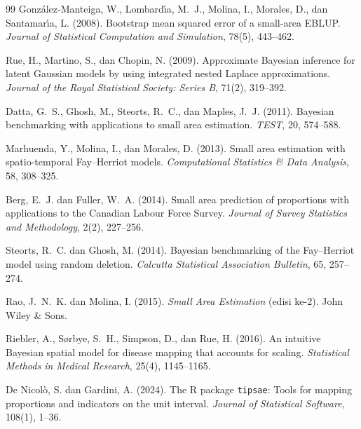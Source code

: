 \documentclass[11pt,a4paper]{article}
\theoremstyle{definition}
\begin{document}
\begin{thebibliography}{99}
Gonz\'alez-Manteiga, W., Lombard{\'\i}a, M.~J., Molina, I., Morales, D., dan
Santamar{\'\i}a, L. (2008).
Bootstrap mean squared error of a small-area EBLUP.
\emph{Journal of Statistical Computation and Simulation}, 78(5), 443--462.

Rue, H., Martino, S., dan Chopin, N. (2009).
Approximate Bayesian inference for latent Gaussian models by using integrated
nested Laplace approximations.
\emph{Journal of the Royal Statistical Society: Series B}, 71(2), 319--392.

Datta, G.~S., Ghosh, M., Steorts, R.~C., dan Maples, J.~J. (2011).
Bayesian benchmarking with applications to small area estimation.
\emph{TEST}, 20, 574--588.

Marhuenda, Y., Molina, I., dan Morales, D. (2013).
Small area estimation with spatio-temporal Fay--Herriot models.
\emph{Computational Statistics \& Data Analysis}, 58, 308--325.

Berg, E.~J. dan Fuller, W.~A. (2014).
Small area prediction of proportions with applications to the Canadian Labour
Force Survey.
\emph{Journal of Survey Statistics and Methodology}, 2(2), 227--256.

Steorts, R.~C. dan Ghosh, M. (2014).
Bayesian benchmarking of the Fay--Herriot model using random deletion.
\emph{Calcutta Statistical Association Bulletin}, 65, 257--274.

Rao, J.~N.~K. dan Molina, I. (2015).
\emph{Small Area Estimation} (edisi ke-2). John Wiley \& Sons.

Riebler, A., S{\o}rbye, S.~H., Simpson, D., dan Rue, H. (2016).
An intuitive Bayesian spatial model for disease mapping that accounts for
scaling.
\emph{Statistical Methods in Medical Research}, 25(4), 1145--1165.

De Nicol\`o, S. dan Gardini, A. (2024).
The R package \texttt{tipsae}: Tools for mapping proportions and indicators on
the unit interval.
\emph{Journal of Statistical Software}, 108(1), 1--36.

\end{thebibliography}
\end{document}
